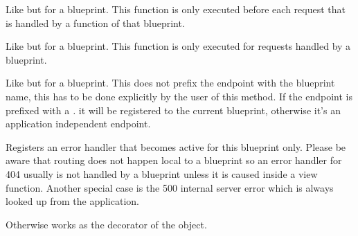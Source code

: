 \documentclass[a4paper,12pt]{sphinxmanual}
\begin{document}
\begin{fulllineitems}
\begin{fulllineitems}
\label{api:flask.Blueprint.before_request}
Like {\hyperref[api:flask.Flask.before_request]{}} but for a blueprint.  This function
is only executed before each request that is handled by a function of
that blueprint.

\end{fulllineitems}


\begin{fulllineitems}
\label{api:flask.Blueprint.context_processor}
Like {\hyperref[api:flask.Flask.context_processor]{}} but for a blueprint.  This
function is only executed for requests handled by a blueprint.

\end{fulllineitems}


\begin{fulllineitems}
\label{api:flask.Blueprint.endpoint}
Like {\hyperref[api:flask.Flask.endpoint]{}} but for a blueprint.  This does not
prefix the endpoint with the blueprint name, this has to be done
explicitly by the user of this method.  If the endpoint is prefixed
with a \emph{.} it will be registered to the current blueprint, otherwise
it's an application independent endpoint.

\end{fulllineitems}


\begin{fulllineitems}
\label{api:flask.Blueprint.errorhandler}
Registers an error handler that becomes active for this blueprint
only.  Please be aware that routing does not happen local to a
blueprint so an error handler for 404 usually is not handled by
a blueprint unless it is caused inside a view function.  Another
special case is the 500 internal server error which is always looked
up from the application.

Otherwise works as the {\hyperref[api:flask.Flask.errorhandler]{}} decorator
of the {\hyperref[api:flask.Flask]{}} object.


\end{fulllineitems}
\end{fulllineitems}
\end{document}

